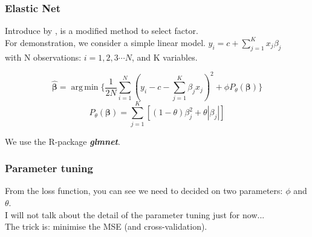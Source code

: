 \documentclass[12pt]{beamer}
\DeclareMathOperator*{\argmin}{arg\,min}
\begin{document}
	
\begin{frame}
\frametitle{Elastic Net}
Introduce by , is a modified method to select factor.\\
For demonstration, we consider a simple linear model. $y_i = c + \sum_{j = 1}^K x_{j}\beta_{j}$ \\with N observations: $i = 1,2,3\cdots N$, and K variables.



\[  \hat{\boldsymbol{\beta}} = \argmin \{ \frac{1}{2N}\sum_{i = 1}^N(y_i - c - \sum_{j=1}^{K}\beta_{j}x_{j})^2 + \phi P_\theta(\boldsymbol{\beta})          \}  \]
\[  P_{\theta}(\boldsymbol{\beta}) = \sum_{j = 1}^{K}[(1- \theta)\beta_j^2 + \theta |\beta_j| ]          \]

	
	
	
	
We use the R-package \textbf{\textit{glmnet}}. \cite{Friedman2010}\\
\end{frame}

\begin{frame}
\frametitle{Parameter tuning}
From the loss function, you can see we need to decided on two parameters: \alert{$\phi$} and \alert{$\theta$}.\\
I will not talk about the detail of the parameter tuning just for now...\\
The trick is: minimise the MSE (and cross-validation).\\
\end{frame}
\end{document}
